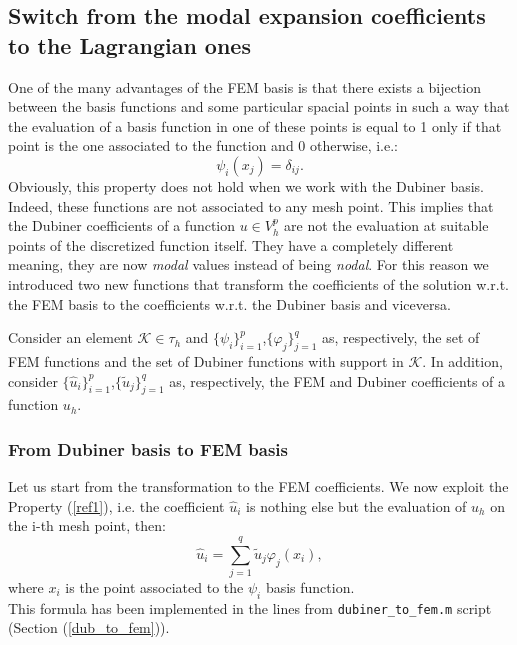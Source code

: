 \documentclass[a4paper,11pt]{article}
\begin{document}
\subsection{Switch from the modal expansion coefficients to the Lagrangian ones}
One of the many advantages of the FEM basis is that there exists a bijection between the basis functions and some particular spacial points in such a way that the evaluation of a basis function in one of these points is equal to 1 only if that point is the one associated to the function and 0 otherwise, i.e.:
	\begin{equation} \label{ref1}
	\psi_i(x_j)=\delta_{ij}.
	\end{equation}
	Obviously, this property does not hold when we work with the Dubiner basis. Indeed, these functions are not associated to any mesh point. This implies that the Dubiner coefficients of a function $u\in V_h^p$ are not the evaluation at suitable points of the discretized function itself. They have a completely different meaning, they are now \emph{modal} values instead of being \emph{nodal}.
	For this reason we introduced two new functions that transform the coefficients of the solution w.r.t. the FEM basis to the coefficients w.r.t. the Dubiner basis and viceversa.\vspace{5mm}
	
	\noindent Consider an element $\mathcal{K}\in \tau_h$ and $\{\psi_{i}\}_{i=1}^{p}$,$\{\varphi_{j}\}_{j=1}^{q}$ as, respectively, the set of FEM functions and the set of Dubiner functions with support in $\mathcal{K}$. In addition, consider $\{\hat{u}_i\}_{i=1}^p$,$\{\tilde{u}_j\}_{j=1}^q$ as, respectively, the FEM and Dubiner coefficients of a function $u_h$.
	
	\subsubsection{From Dubiner basis to FEM basis}
	\noindent Let us start from the transformation to the FEM coefficients. We now exploit the Property (\ref{ref1}), i.e. the coefficient $\hat{u}_i$ is nothing else but the evaluation of $u_h$ on the i-th mesh point, then: 
	\begin{equation} \label{ref3}
	\hat{u}_i = \sum_{j=1}^q \tilde{u}_j\varphi_j(x_i),
	\end{equation}
	where $x_i$ is the point associated to the $\psi_i$ basis function. \\
	This formula has been implemented in the lines from \texttt{dubiner\_to\_fem.m} script (Section (\ref{dub_to_fem})).
\end{document}
